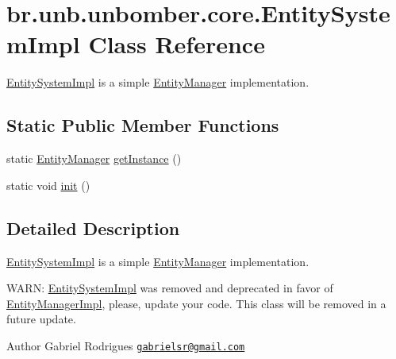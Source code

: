 \hypertarget{classbr_1_1unb_1_1unbomber_1_1core_1_1_entity_system_impl}{\section{br.\+unb.\+unbomber.\+core.\+Entity\+System\+Impl Class Reference}
\label{classbr_1_1unb_1_1unbomber_1_1core_1_1_entity_system_impl}
}


\hyperlink{classbr_1_1unb_1_1unbomber_1_1core_1_1_entity_system_impl}{Entity\+System\+Impl} is a simple \hyperlink{interfacebr_1_1unb_1_1unbomber_1_1core_1_1_entity_manager}{Entity\+Manager} implementation.  


\subsection*{Static Public Member Functions}
\begin{DoxyCompactItemize}
\item 
static \hyperlink{interfacebr_1_1unb_1_1unbomber_1_1core_1_1_entity_manager}{Entity\+Manager} \hyperlink{classbr_1_1unb_1_1unbomber_1_1core_1_1_entity_system_impl_a771f35ea76fd792dbb9e432a275a6689}{get\+Instance} ()
\item 
static void \hyperlink{classbr_1_1unb_1_1unbomber_1_1core_1_1_entity_system_impl_a30972e66e69443f5b5c745e952046607}{init} ()
\end{DoxyCompactItemize}


\subsection{Detailed Description}
\hyperlink{classbr_1_1unb_1_1unbomber_1_1core_1_1_entity_system_impl}{Entity\+System\+Impl} is a simple \hyperlink{interfacebr_1_1unb_1_1unbomber_1_1core_1_1_entity_manager}{Entity\+Manager} implementation. 

W\+A\+R\+N\+: \hyperlink{classbr_1_1unb_1_1unbomber_1_1core_1_1_entity_system_impl}{Entity\+System\+Impl} was removed and deprecated in favor of \hyperlink{classbr_1_1unb_1_1unbomber_1_1core_1_1_entity_manager_impl}{Entity\+Manager\+Impl}, please, update your code. This class will be removed in a future update.

\begin{DoxyAuthor}{Author}
Gabriel Rodrigues \href{mailto:gabrielsr@gmail.com}{\tt gabrielsr@gmail.\+com} 
\end{DoxyAuthor}


